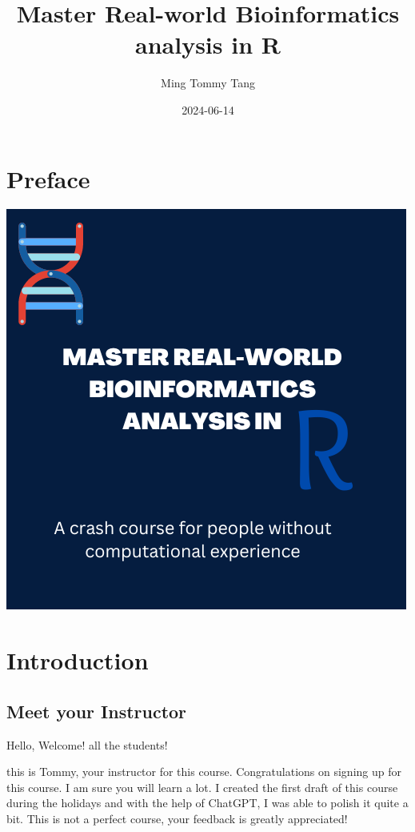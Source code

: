 \documentclass[
]{book}
\title{Master Real-world Bioinformatics analysis in R}
\author{Ming Tommy Tang}
\date{2024-06-14}
\begin{document}
\maketitle

{
\setcounter{tocdepth}{1}
\tableofcontents
}
\hypertarget{preface}{%
\chapter{Preface}\label{preface}}

\includegraphics{images/bookcover.png}

\hypertarget{intro}{%
\chapter{Introduction}\label{intro}}

\hypertarget{meet-your-instructor}{%
\section{Meet your Instructor}\label{meet-your-instructor}}

Hello, Welcome! all the students!

this is Tommy, your instructor for this course. Congratulations on signing up for this course. I am sure you will learn a lot. I created the first draft of this course during the holidays and with the help of ChatGPT, I was able to polish it quite a bit. This is not a perfect course, your feedback is greatly appreciated!
\end{document}
